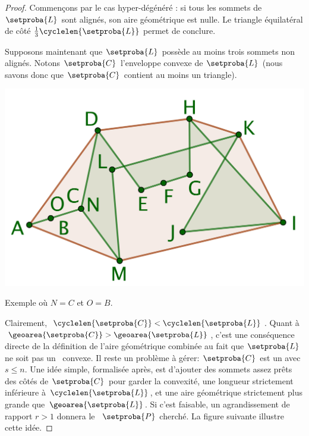 \begin{proof}
	Commençons par le cas \og hyper-dégénéré \fg: si tous les sommets de $\setproba{L}$ sont alignés, son aire géométrique est nulle. Le triangle équilatéral de côté $\frac13 \cyclelen{\setproba{L}}$ permet de conclure.
	
	Supposons maintenant que $\setproba{L}$ possède au moins trois sommets non alignés.
	Notons $\setproba{C}$ l'enveloppe convexe de $\setproba{L}$ (nous savons donc que $\setproba{C}$ contient au moins un triangle).
	
	\begin{center}
		\centering
		\small\itshape
		\includegraphics[scale=.45]{content/polygon/sol-is/convex-hull.png}
		
		\smallskip
		Exemple où $N = C$ et $O = B$.
	\end{center}
	
		
	Clairement, $\cyclelen{\setproba{C}} < \cyclelen{\setproba{L}}$.
	Quant à $\geoarea{\setproba{C}} > \geoarea{\setproba{L}}$, c'est une conséquence directe de la définition de l'aire géométrique combinée au fait que $\setproba{L}$ ne soit pas un \ngone\ convexe.
	Il reste un problème à gérer: $\setproba{C}$ est un  avec $s \leq n$. 
	Une idée simple, formalisée après, est d'ajouter des sommets assez prêts des côtés de $\setproba{C}$ pour garder la convexité, une longueur strictement inférieure à $\cyclelen{\setproba{L}}$, et une aire géométrique strictement plus grande que $\geoarea{\setproba{L}}$. Si c'est faisable, un agrandissement de rapport $r > 1$ donnera le \ngone\ $\setproba{P}$ cherché.
	La figure suivante illustre cette idée.


\end{proof}
